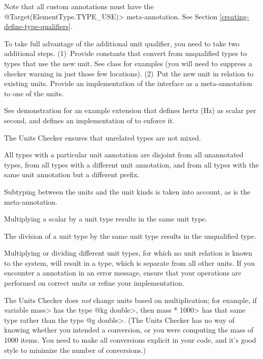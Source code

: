 Note that all custom annotations must have the
\<@Target(ElementType.TYPE\_USE)> meta-annotation. See Section
\ref{creating-define-type-qualifiers}.

To take full advantage of the additional unit qualifier, you need to
take two additional steps.
(1)~Provide constants that convert from unqualified types to types that use
the new unit.
See class  for examples (you will need to suppress a
checker warning in just those few locations).
(2)~Put the new unit in relation to existing units.
Provide an
implementation of the  interface as a
meta-annotation to one of the units.

See demonstration  for an example
extension that defines hertz (Hz) as scalar per second, and defines an
implementation of  to enforce it.




The Units Checker ensures that unrelated types are not mixed.

All types with a particular unit annotation are
disjoint from all unannotated types, from all types with a different unit
annotation, and from all types with the same unit annotation but a
different prefix.

Subtyping between the units and the unit kinds is taken into account,
as is the  meta-annotation.

Multiplying a scalar by a unit type results in the same unit type.

The division of a unit type by the same unit type
results in the unqualified type.

Multiplying or dividing different unit types, for which no unit
relation is known to the system, will result in a 
type, which is separate from all other units.
If you encounter a  annotation in an error message,
ensure that your operations are performed on correct units or refine
your  implementation.

The Units Checker does \emph{not} change units based on multiplication; for
example, if variable \<mass> has the type \<@kg double>, then \<mass *
1000> has that same type rather than the type \<@g double>.  (The Units
Checker has no way of knowing whether you intended a conversion, or you
were computing the mass of 1000 items.  You need to make all conversions
explicit in your code, and it's good style to minimize the number of
conversions.)


